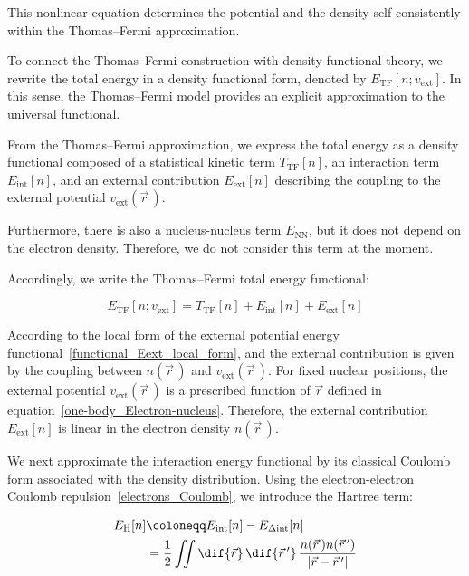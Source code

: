 This nonlinear equation determines the potential and the density self-consistently within the Thomas--Fermi approximation.

To connect the Thomas--Fermi construction with density functional theory, we rewrite the total energy in a density functional form, denoted by $E_{\mathrm{TF}}[n;v_\mathrm{ext}]$. In this sense, the Thomas--Fermi model provides an explicit approximation to the universal functional.

From the Thomas--Fermi approximation, we express the total energy as a density functional composed of a statistical kinetic term $T_\mathrm{TF}[n]$, an interaction term $E_\mathrm{int}[n]$, and an external contribution $E_\mathrm{ext}[n]$ describing the coupling to the external potential $v_\mathrm{ext}(\vec{r}\,)$.

Furthermore, there is also a nucleus-nucleus term $E_\mathrm{NN}$, but it does not depend on the electron density. Therefore, we do not consider this term at the moment.

Accordingly, we write the Thomas--Fermi total energy functional:

\begin{equation}
    E_{\mathrm{TF}}[n;v_\mathrm{ext}] = T_\mathrm{TF}[n] + E_\mathrm{int}[n] + E_\mathrm{ext}[n]
\label{TF_total_energy_functional}
\end{equation}

According to the local form of the external potential energy functional~\eqref{functional_Eext_local_form}, and the external contribution is given by the coupling between $n(\vec{r}\,)$ and $v_\mathrm{ext}(\vec{r}\,)$.
For fixed nuclear positions, the external potential $v_\mathrm{ext}(\vec{r}\,)$ is a prescribed function of $\vec{r}$ defined in equation~\eqref{one-body_Electron-nucleus}. Therefore, the external contribution $E_\mathrm{ext}[n]$ is linear in the electron density $n(\vec{r}\,)$.

We next approximate the interaction energy functional by its classical Coulomb form associated with the density distribution.
Using the electron-electron Coulomb repulsion~\eqref{electrons_Coulomb}, we introduce the Hartree term:

\begin{equation}
\begin{aligned}
    E_\mathrm{H}[n] &\coloneqq E_\mathrm{int}[n]-E_{\Delta\mathrm{int}}[n] \\
    &= \frac{1}{2}\iint\dif{\vec{r}}\,\dif{\vec{r}\,'}\,\frac{n(\vec{r}\,)n(\vec{r}\,')}{|\vec{r}-\vec{r}\,'|}
\label{hartree_term_functional}
\end{aligned}
\end{equation}

